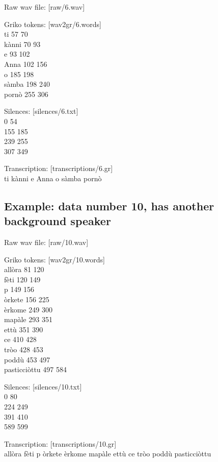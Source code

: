 \documentclass{article}
\begin{document}
	Raw wav file: [raw/6.wav]
	
	Griko tokens: [wav2gr/6.words] \\			
		ti 57 70 \\
		k\`{a}nni 70 93 \\
		e 93 102 \\
		Anna 102 156 \\
		o 185 198 \\
		s\`{a}mba 198 240 \\
		porn\`{o} 255 306

	Silences: [silences/6.txt] \\
		0 54 \\
		155 185 \\
		239 255 \\
		307 349

	Transcription: [transcriptions/6.gr] \\
		ti k\`{a}nni e Anna o s\`{a}mba porn\`{o}




\subsection{Example: data number 10, has another background speaker}
	
	Raw wav file: [raw/10.wav]
	
	Griko tokens: [wav2gr/10.words] \\
		all\`{o}ra 81 120 \\
		f\`{e}ti 120 149 \\
		p 149 156 \\
		\`{o}rkete 156 225 \\
		\`{e}rkome 249 300 \\
		map\`{a}le 293 351 \\
		ett\`{u} 351 390 \\
		ce 410 428 \\
		tr\`{o}o 428 453 \\
		podd\`{u} 453 497 \\
		pasticci\`{o}ttu 497 584

	Silences: [silences/10.txt] \\
		0 80 \\
		224 249 \\
		391 410 \\
		589 599

	Transcription: [transcriptions/10.gr] \\
		all\`{o}ra f\`{e}ti p \`{o}rkete \`{e}rkome map\`{a}le ett\`{u} ce tr\`{o}o podd\`{u} pasticci\`{o}ttu
\end{document}
